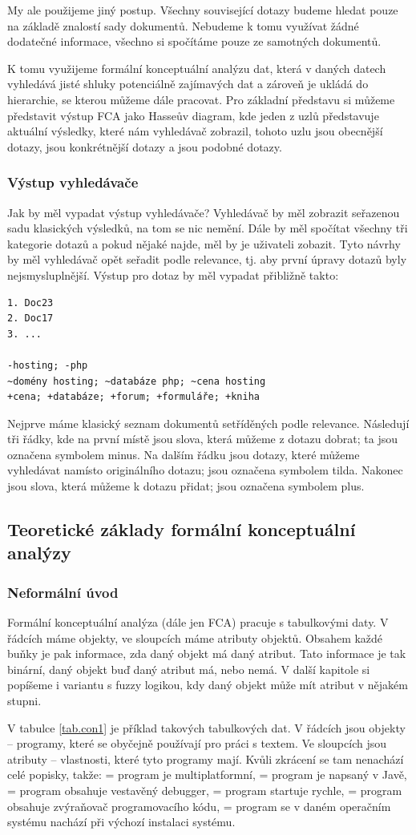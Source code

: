 \documentclass[12pt]{article}
\newcommand{\ssection}[1]{\subsection{#1}}
\newcommand{\sssection}[1]{\subsubsection{#1}}
\begin{document}
My ale použijeme jiný postup. Všechny související dotazy budeme hledat pouze na základě znalostí sady dokumentů. Nebudeme k tomu využívat žádné dodatečné informace, všechno si spočítáme pouze ze samotných dokumentů.

K tomu využijeme formální konceptuální analýzu dat, která v daných datech vyhledává jisté shluky potenciálně zajímavých dat a zároveň je ukládá do hierarchie, se kterou můžeme dále pracovat. Pro základní představu si můžeme představit výstup FCA jako Hasseův diagram, kde jeden z uzlů představuje aktuální výsledky, které nám vyhledávač zobrazil,  tohoto uzlu jsou obecnější dotazy,  jsou konkrétnější dotazy a  jsou podobné dotazy. 

\sssection{Výstup vyhledávače}

Jak by měl vypadat výstup vyhledávače? Vyhledávač by měl zobrazit seřazenou sadu klasických výsledků, na tom se nic nemění. Dále by měl spočítat všechny tři kategorie dotazů a pokud nějaké najde, měl by je uživateli zobazit. Tyto návrhy by měl vyhledávač opět seřadit podle relevance, tj. aby první úpravy dotazů byly nejsmysluplnější. Výstup pro dotaz  by měl vypadat přibližně takto:

\begin{verbatim}
1. Doc23
2. Doc17
3. ... 

-hosting; -php
~domény hosting; ~databáze php; ~cena hosting
+cena; +databáze; +forum; +formuláře; +kniha
\end{verbatim}

Nejprve máme klasický seznam dokumentů setříděných podle relevance. Následují tři řádky, kde na první místě jsou slova, která můžeme z dotazu dobrat; ta jsou označena symbolem minus. Na dalším řádku jsou dotazy, které můžeme vyhledávat namísto originálního dotazu; jsou označena symbolem tilda. Nakonec jsou slova, která můžeme k dotazu přidat; jsou označena symbolem plus.

\ssection{Teoretické základy formální konceptuální analýzy}
\sssection{Neformální úvod}
Formální konceptuální analýza (dále jen FCA) pracuje s tabulkovými daty. V řádcích máme objekty, ve sloupcích máme atributy objektů. Obsahem každé buňky je pak informace, zda daný objekt má daný atribut. Tato informace je tak binární, daný objekt buď daný atribut má, nebo nemá. V další kapitole si popíšeme i variantu s fuzzy logikou, kdy daný objekt může mít atribut v nějakém stupni. 

V tabulce \ref{tab.con1} je příklad takových tabulkových dat. V řádcích jsou objekty -- programy, které se obyčejně používají pro práci s textem. Ve sloupcích jsou atributy -- vlastnosti, které tyto programy mají. Kvůli zkrácení se tam nenachází celé popisky, takže:  = program je multiplatformní,  = program je napsaný v Javě,  = program obsahuje vestavěný debugger,  = program startuje rychle,  = program obsahuje zvýraňovač programovacího kódu,  = program se v daném operačním systému nachází při výchozí instalaci systému. 
\end{document}
